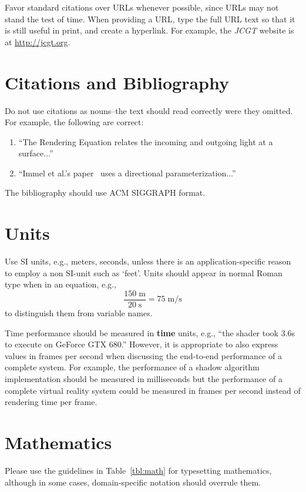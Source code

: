 \documentclass{jcgt}
\begin{document}
Favor standard citations over URLs whenever possible, since URLs may not stand the test of time.  When providing a URL, type the full URL text so that it is still useful in print, and create a hyperlink.  For example,
the \textit{JCGT} website is at \href{http://jcgt.org}{http://jcgt.org}.

\section{Citations and Bibliography}
Do not use citations as nouns--the text should read correctly were they omitted. For example, the following are correct:

\begin{enumerate}
\item ``The Rendering Equation \cite{Immel:1986:RMN:15886.15901,Kajiya:1986:RE:15922.15902} relates the incoming and outgoing light at a surface...''
\item ``Immel et al.'s paper~ uses a directional parameterization...''
\end{enumerate}

\noindent The bibliography should use ACM SIGGRAPH format.

\section{Units}
Use SI units, e.g., meters, seconds, unless there is an application-specific reason to employ a non SI-unit such as `feet'.  Units should appear in normal Roman type when in an equation, e.g.,
%
\begin{equation}
\frac{150\;\mathrm{m}}{20\;\mathrm{s}} = 75\;\mathrm{m}/\mathrm{s}
\end{equation}
%
to distinguish them from variable names.

Time performance should be measured in \textbf{time} units, e.g., ``the shader took 3.6\;s to execute on GeForce GTX 680.''  However, it is appropriate to also express values in frames per second when discussing the end-to-end performance of a complete system.  For example, the performance of a shadow algorithm implementation should be measured in milliseconds but the performance of a complete virtual reality system could be measured in frames per second instead of rendering time per frame.

\section{Mathematics}
Please use the guidelines in Table~\ref{tbl:math} for typesetting mathematics, although in some cases, domain-specific notation should overrule them.
\end{document}
